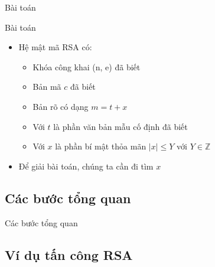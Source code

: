\begin{frame}{Bài toán}

\begin{block}{Bài toán}
\begin{itemize}
\item Hệ mật mã RSA có:

\begin{itemize}
\item Khóa công khai (n, e) đã biết
\item Bản mã $c$ đã biết
\item Bản rõ có dạng $m = t + x$
\item Với $t$ là phần văn bản mẫu cố định đã biết
\item Với $x$ là phần bí mật thỏa mãn $|x| \leq Y$ với \(Y \in \mathbb{Z} \)
\end{itemize}
\item Để giải bài toán, chúng ta cần đi tìm $x$
\end{itemize}

\end{block}

\end{frame}
\subsection{Các bước tổng quan}

\begin{frame}{Các bước tổng quan}

\end{frame}
\subsection{Ví dụ tấn công RSA}

